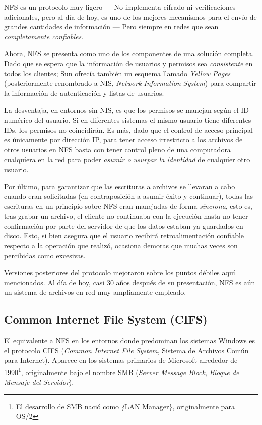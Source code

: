 \documentclass[11pt,fleqn]{book} %
\begin{document}
NFS es un protocolo muy ligero — No implementa cifrado ni
verificaciones adicionales, pero al día de hoy, es uno de los mejores
mecanismos para el envío de grandes cantidades de información — Pero
siempre en redes que sean \emph{completamente confiables}.

Ahora, NFS se presenta como uno de los componentes de una solución
completa. Dado que se espera que la información de usuarios y permisos
sea \emph{consistente} en todos los clientes; Sun ofrecía también un
esquema llamado \emph{Yellow Pages} (posteriormente renombrado a NIS,
\emph{Network Information System}) para compartir la información de
autenticación y listas de usuarios.

La desventaja, en entornos sin NIS, es que los permisos se manejan
según el ID numérico del usuario. Si en diferentes sistemas el mismo
usuario tiene diferentes IDs, los permisos no coincidirán. Es más,
dado que el control de acceso principal es únicamente por dirección
IP, para tener acceso irrestricto a los archivos de otros usuarios en
NFS basta con tener control pleno de una computadora cualquiera en la
red para poder \emph{asumir o usurpar la identidad} de cualquier otro
usuario.

Por último, para garantizar que las escrituras a archivos se llevaran
a cabo cuando eran solicitadas (en contraposición a asumir éxito y
continuar), todas las escrituras en un principio sobre NFS eran
manejadas de forma \emph{síncrona}, esto es, tras grabar un archivo, el
cliente no continuaba con la ejecución hasta no tener confirmación por
parte del servidor de que los datos estaban ya guardados en
disco. Esto, si bien asegura que el usuario recibirá retroalimentación
confiable respecto a la operación que realizó, ocasiona demoras que
muchas veces son percibidas como excesivas.

Versiones posteriores del protocolo mejoraron sobre los puntos débiles
aquí mencionados. Al día de hoy, casi 30 años después de su
presentación, NFS es aún un sistema de archivos en red muy ampliamente
empleado.
\subsection{Common Internet File System (CIFS)}
\label{sec-6-4-2}


El equivalente a NFS en los entornos donde predominan los sistemas
Windows es el protocolo CIFS (\emph{Common Internet File System}, Sistema
de Archivos Común para Internet). Aparece en los sistemas primarios de
Microsoft alrededor de 1990\footnote{El desarrollo de SMB nació como \emph\{LAN
Manager\}, originalmente para OS/2 }, originalmente bajo el nombre SMB
(\emph{Server Message Block}, \emph{Bloque de Mensaje del Servidor}).
\end{document}
